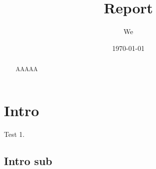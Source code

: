 \documentclass[10pt]{article}
\title{Report}
\date{\today}
\author{We}
\begin{document}
	\maketitle

	\begin{abstract}

		AAAAA
		
	\end{abstract}

	\tableofcontents

	\section{Intro}

	Test 1.

	\subsection{Intro sub}
\end{document}
